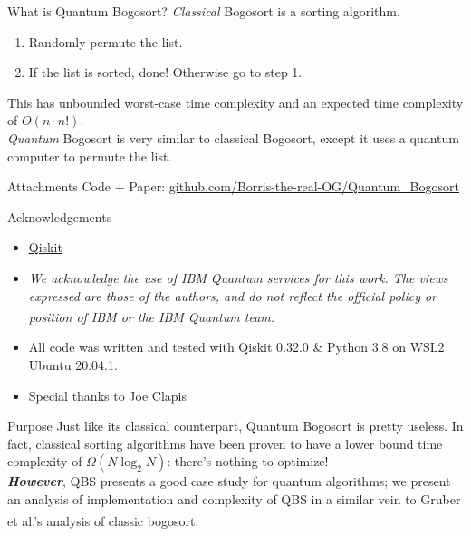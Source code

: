 \documentclass{beamer}
\begin{document}
  \begin{frame}{What is Quantum Bogosort?}
    \textit{Classical} Bogosort is a sorting algorithm.
    \begin{enumerate}
        \item Randomly permute the list.
        \item If the list is sorted, done! Otherwise go to step 1.
    \end{enumerate}
    This has unbounded worst-case time complexity and an expected time complexity of $O(n \cdot n!)$. \\
    \vspace{10}
    \textit{Quantum} Bogosort is very similar to classical Bogosort, except it uses a quantum computer to permute the list.
  \end{frame}
  
  \begin{frame}{Attachments}
  Code + Paper: \href{https://github.com/Borris-the-real-OG/Quantum_Bogosort}{\color{blue} \underline{github.com/Borris-the-real-OG/Quantum\_Bogosort}}
  \end{frame}
  
  \begin{frame}{Acknowledgements}
  \begin{itemize}
  \item \href{https://qiskit.org/}{\color{blue} \underline{Qiskit}}
  \item \emph{We acknowledge the use of IBM Quantum services for this work. The views expressed are those of the authors, and do not reflect the official policy or position of IBM or the IBM Quantum team.\textsuperscript{\color{blue}\cite{ibm_21}}}
  \item All code was written and tested with Qiskit 0.32.0 \& Python 3.8 on WSL2 Ubuntu 20.04.1.
  \item Special thanks to Joe Clapis
  \end{itemize}
  \end{frame}
  
  \begin{frame}{Purpose}
  Just like its classical counterpart, Quantum Bogosort is pretty useless. In fact, classical sorting algorithms have been proven to have a lower bound time complexity of $ \Omega (N \log_2 N) $: there's nothing to optimize! \\
  \textbf{\textit{However}}, QBS presents a good case study for quantum algorithms; we present an analysis of implementation and complexity of QBS in a similar vein to Gruber et al.'s\textsuperscript{\color{blue}\cite{gruber_holzer_ruepp_2007}} analysis of classic bogosort.
  \end{frame}
  
\end{document}
